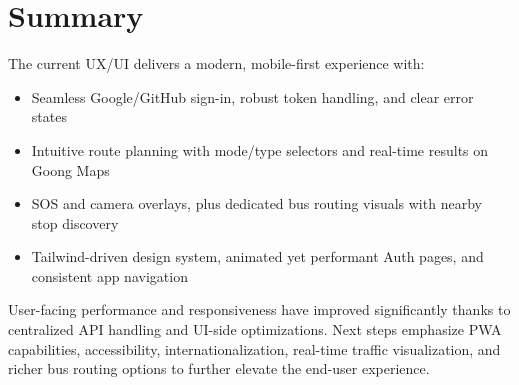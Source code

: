 \section{Summary}

The current UX/UI delivers a modern, mobile-first experience with:
\begin{itemize}
    \item Seamless Google/GitHub sign-in, robust token handling, and clear error states
    \item Intuitive route planning with mode/type selectors and real-time results on Goong Maps
    \item SOS and camera overlays, plus dedicated bus routing visuals with nearby stop discovery
    \item Tailwind-driven design system, animated yet performant Auth pages, and consistent app navigation
\end{itemize}

User-facing performance and responsiveness have improved significantly thanks to centralized API handling and UI-side optimizations. Next steps emphasize PWA capabilities, accessibility, internationalization, real-time traffic visualization, and richer bus routing options to further elevate the end-user experience.
